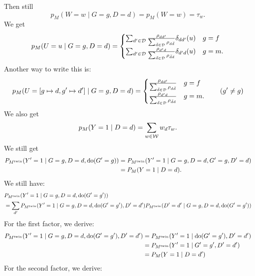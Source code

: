 {Then still
$$p_M(W=w \mid G=g, D=d) = p_M(W=w) = \tau_w.$$
We get
\begin{equation}\label{eq:CUF1}
  p_M(U=u \mid G=g, D=d) = 
    \begin{cases}
      \sum_{d' \in \mathcal{D}} \frac{\rho_{d d'}}{\sum_{\bar{d} \in \mathcal{D}} \rho_{d\bar{d}}} \delta_{d d'}(u) & g=f \\
      \sum_{d' \in \mathcal{D}} \frac{\rho_{d' d}}{\sum_{\bar{d} \in \mathcal{D}} \rho_{\bar{d}d}} \delta_{d' d}(u) & g=m.
    \end{cases}
\end{equation}
Another way to write this is:
$$p_M(U=[g \mapsto d,g' \mapsto d'] \mid G=g, D=d) = 
    \begin{cases}
      \frac{\rho_{d d'}}{\sum_{\bar{d} \in \mathcal{D}} \rho_{d\bar{d}}} & g=f \\
      \frac{\rho_{d' d}}{\sum_{\bar{d} \in \mathcal{D}} \rho_{\bar{d}d}} & g=m.
    \end{cases} \qquad (g' \ne g)$$
We also get
  \begin{equation}\label{eq:CUF2}
    p_M(Y=1 \mid D=d) = \sum_{w\in \mathcal{W}} w_d \tau_w.
  \end{equation}
We still get
\begin{equation*}\begin{split}
    P_{M^{\mathrm{twin}}}(Y'=1 \mid G=g,D=d,\operatorname{do}(G'=g)) 
      &= P_{M^{\mathrm{twin}}}(Y'=1 \mid G=g,D=d,G'=g,D'=d) \\
      &= P_M(Y=1 \mid D=d).
\end{split}\end{equation*}
We still have:
      \begin{equation*}\begin{split}
        &P_{M^{\mathrm{twin}}}(Y'=1 \mid G=g,D=d,\operatorname{do}(G'=g')) \\
        &= \sum_{d'} P_{M^{\mathrm{twin}}}(Y'=1 \mid G=g,D=d,\operatorname{do}(G'=g'),D'=d') P_{M^{\mathrm{twin}}}(D'=d' \mid G=g,D=d,\operatorname{do}(G'=g'))
      \end{split}\end{equation*}
For the first factor, we derive:
  \begin{equation*}\begin{split}
    P_{M^{\mathrm{twin}}}(Y'=1 \mid G=g,D=d,\operatorname{do}(G'=g'),D'=d')
    &= P_{M^{\mathrm{twin}}}(Y'=1 \mid \operatorname{do}(G'=g'),D'=d') \\
    &= P_{M^{\mathrm{twin}}}(Y'=1 \mid G'=g',D'=d') \\
    &= P_{M}(Y=1 \mid D=d')
  \end{split}\end{equation*}
For the second factor, we derive:
}
